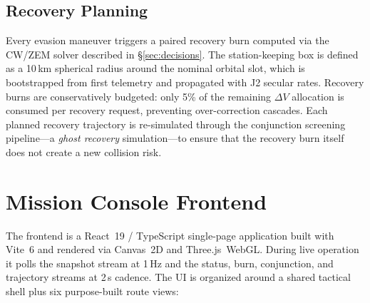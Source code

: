 \documentclass[10pt,twocolumn,letterpaper]{article}
\begin{document}
\subsection{Recovery Planning}

Every evasion maneuver triggers a paired recovery burn computed via the
CW/ZEM solver described in \S\ref{sec:decisions}.  The station-keeping
box is defined as a 10\,km spherical radius around the nominal orbital
slot, which is bootstrapped from first telemetry and propagated with
J2 secular rates.  Recovery burns are conservatively budgeted: only
5\% of the remaining $\Delta V$ allocation is consumed per recovery
request, preventing over-correction cascades.  Each planned recovery
trajectory is re-simulated through the conjunction screening pipeline---a
\emph{ghost recovery} simulation---to ensure that the recovery burn
itself does not create a new collision risk.

\section{Mission Console Frontend}\label{sec:frontend}

The frontend is a React~19 / TypeScript single-page application built with
Vite~6 and rendered via Canvas~2D and Three.js~WebGL.  During live
operation it polls the snapshot stream at 1\,Hz and the status, burn,
conjunction, and trajectory streams at 2\,s cadence.  The UI is organized
around a shared tactical shell plus six purpose-built route views:
\end{document}
